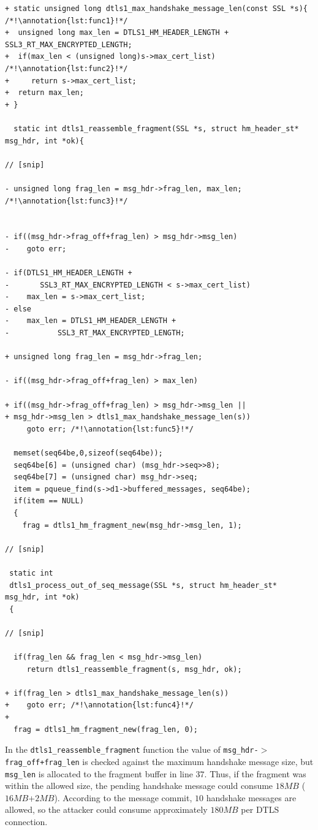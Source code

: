 \documentclass[10pt,conference]{IEEEtran}
\newcounter{lstannotation}
\renewcommand{\thelstannotation}{\ding{\number\numexpr181+\arabic{lstannotation}}}
\newcommand{\annotation}[1]{\refstepcounter{lstannotation}\label{#1}\thelstannotation}
\newcommand{\Sof}[1]{\textbf{[Sofia:[}{\color{red} #1}\textbf{]]}}
\begin{document}
\setcounter{lstannotation}{0}
\begin{lstlisting}[caption={Fix provided by OpenSSL developers to the CVE-2014-3506 vulnerability \Sof{@todo: Fix the regex issue}},label={lst:vuln}]
+ static unsigned long dtls1_max_handshake_message_len(const SSL *s){ /*!\annotation{lst:func1}!*/
+  unsigned long max_len = DTLS1_HM_HEADER_LENGTH + SSL3_RT_MAX_ENCRYPTED_LENGTH;
+  if(max_len < (unsigned long)s->max_cert_list) /*!\annotation{lst:func2}!*/
+     return s->max_cert_list;
+  return max_len;
+ }

  static int dtls1_reassemble_fragment(SSL *s, struct hm_header_st* msg_hdr, int *ok){

// [snip]

- unsigned long frag_len = msg_hdr->frag_len, max_len; /*!\annotation{lst:func3}!*/
            
			
- if((msg_hdr->frag_off+frag_len) > msg_hdr->msg_len)
-    goto err;

- if(DTLS1_HM_HEADER_LENGTH +
-    	SSL3_RT_MAX_ENCRYPTED_LENGTH < s->max_cert_list)
-    max_len = s->max_cert_list;
- else
-    max_len = DTLS1_HM_HEADER_LENGTH +
-   		SSL3_RT_MAX_ENCRYPTED_LENGTH;

+ unsigned long frag_len = msg_hdr->frag_len;

- if((msg_hdr->frag_off+frag_len) > max_len)

+ if((msg_hdr->frag_off+frag_len) > msg_hdr->msg_len ||
+ msg_hdr->msg_len > dtls1_max_handshake_message_len(s))
     goto err; /*!\annotation{lst:func5}!*/

  memset(seq64be,0,sizeof(seq64be));
  seq64be[6] = (unsigned char) (msg_hdr->seq>>8);
  seq64be[7] = (unsigned char) msg_hdr->seq;
  item = pqueue_find(s->d1->buffered_messages, seq64be);
  if(item == NULL)
  {
    frag = dtls1_hm_fragment_new(msg_hdr->msg_len, 1);

// [snip]

 static int
 dtls1_process_out_of_seq_message(SSL *s, struct hm_header_st* msg_hdr, int *ok)
 {

// [snip]

  if(frag_len && frag_len < msg_hdr->msg_len)
     return dtls1_reassemble_fragment(s, msg_hdr, ok);

+ if(frag_len > dtls1_max_handshake_message_len(s))
+    goto err; /*!\annotation{lst:func4}!*/
+
  frag = dtls1_hm_fragment_new(frag_len, 0);

\end{lstlisting}

In the \texttt{dtls1\_reassemble\_fragment} function the value of
\texttt{msg\_hdr-$>$frag\_off+frag\_len} is checked against the maximum
handshake message size, but \texttt{msg\_len} is allocated to the fragment
buffer in line $37$. Thus, if the fragment was within the allowed size, the
pending handshake message could consume $18MB$ ($16MB$+$2MB$). According to the
message commit, $10$ handshake messages are allowed, so the attacker could
consume approximately $180MB$ per DTLS connection.
\end{document}
